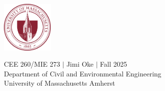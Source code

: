\documentclass[12pt,twoside]{article}
\newcommand{\?}{\stackrel{?}{=}}
\newcommand{\gr}{\color{green!40!black}}
\newcommand{\nmfr}[3]{\Phi\left(\frac{{#1} - {#2}}{#3}\right)}
\begin{document}






\newpage
~
\thispagestyle{empty}
\vfill
\begin{center}
  \includegraphics[width=1in]{umass-seal}
  
  {\sc
    CEE 260/MIE 273 $|$ Jimi Oke $|$ Fall 2025\\
    Department of Civil and Environmental Engineering \\
    University of Massachusetts Amherst
  }
\end{center}
\end{document}
